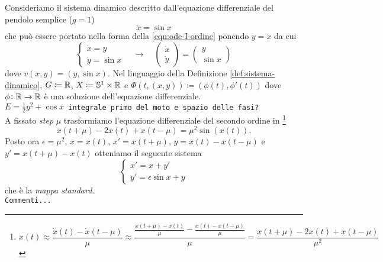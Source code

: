 \begin{example}
	Consideriamo il sistema dinamico descritto dall'equazione differenziale del pendolo semplice ($ g = 1 $)
	\[
		\ddot{x} = \sin{x}
	\]
	che può essere portato nella forma della \eqref{eqn:ode-I-ordine} ponendo $ y = \dot{x} $ da cui 
	\[
		\begin{cases}
			\dot{x} = y \\
			\dot{y} = \sin{x}
		\end{cases}
		\quad \rightarrow \quad
		\begin{pmatrix}
			\dot{x} \\ \dot{y}
		\end{pmatrix}
		=
		\begin{pmatrix}
			y \\ \sin{x}
		\end{pmatrix}
	\]
	dove $ v(x, y) = (y, \sin{x}) $. Nel linguaggio della Definizione \ref{def:sistema-dinamico}, $ G \coloneqq \mathbb{R} $, $ X \coloneqq \mathbb{S}^1 \times \mathbb{R}  $ e $ {\Phi(t, (x, y)) \coloneqq (\phi(t), \phi'(t))} $ dove $ \phi \colon \mathbb{R} \to \mathbb{R} $ è una soluzione dell'equazione differenziale. \\
	\texttt{$ E = \frac{1}{2}y^2 + \cos{x} $ integrale primo del moto e spazio  delle fasi?} \\
	A fissato \emph{step} $ \mu $ trasformiamo l'equazione differenziale del secondo ordine in \footnote{%
		\[
			\ddot{x}(t) \approx \frac{\dot{x}(t) - \dot{x}(t - \mu)}{\mu} \approx \frac{\frac{x(t + \mu) - x(t)}{\mu} - \frac{x(t) - x(t - \mu)}{\mu}}{\mu} = \frac{x(t + \mu) - 2x(t) + x(t - \mu)}{\mu^2}
		\]
	}
	\[
		x(t + \mu) - 2 x(t) + x(t - \mu) = \mu^2 \sin(x(t)).
	\]
	Posto ora $ \epsilon = \mu^2 $, $ x = x(t) $, $ x' = x(t + \mu) $, $ y = x(t) - x(t - \mu) $ e $ y' = x(t + \mu) - x(t) $ otteniamo il seguente sistema 
	\[
		\begin{cases}
			x' = x + y' \\
			y' = \epsilon \sin{x} + y 
		\end{cases}
	\]
	che è la \emph{mappa standard}. \\
	\texttt{Commenti...}
	
\end{example}
